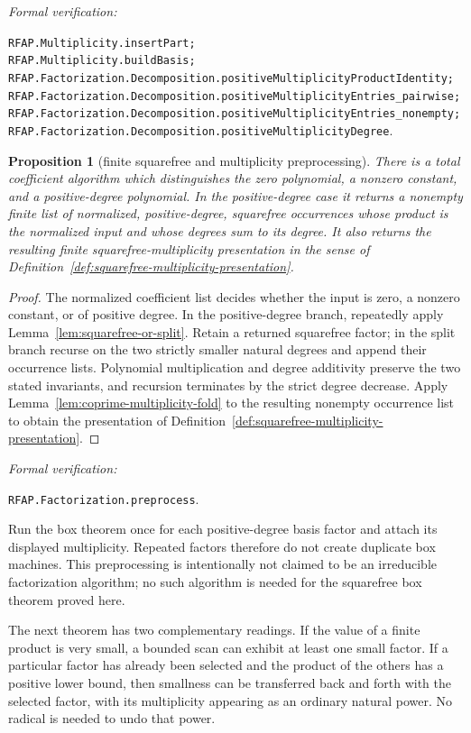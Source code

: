\documentclass[11pt]{article}
\newtheorem{proposition}[theorem]{Proposition}
\newcommand{\Defref}[1]{Definition~\ref{#1}}
\newcommand{\leanref}[1]{\par\smallskip\noindent
  \emph{Formal verification:}\par\nobreak
  {\raggedright\nolinkurl{#1}.\par}}
\begin{document}
\leanref{RFAP.Multiplicity.insertPart;
RFAP.Multiplicity.buildBasis;
RFAP.Factorization.Decomposition.positiveMultiplicityProductIdentity;
RFAP.Factorization.Decomposition.positiveMultiplicityEntries_pairwise;
RFAP.Factorization.Decomposition.positiveMultiplicityEntries_nonempty;
RFAP.Factorization.Decomposition.positiveMultiplicityDegree}

\begin{proposition}[finite squarefree and multiplicity preprocessing]
\label{prop:factor}
There is a total coefficient algorithm which distinguishes the zero
polynomial, a nonzero constant, and a positive-degree polynomial.  In the
positive-degree case it returns a nonempty finite list of normalized,
positive-degree, squarefree occurrences whose product is the
normalized input and whose degrees sum to its degree.  It also returns the
resulting finite squarefree-multiplicity presentation in the sense of
\Defref{def:squarefree-multiplicity-presentation}.
\end{proposition}

\begin{proof}
The normalized coefficient list decides whether the input is zero, a nonzero
constant, or of positive degree.  In the positive-degree branch, repeatedly
apply Lemma~\ref{lem:squarefree-or-split}.  Retain a returned squarefree factor;
in the split branch recurse on the two strictly smaller natural degrees and
append their occurrence lists.  Polynomial multiplication and degree
additivity preserve the two stated invariants, and recursion
terminates by the strict degree decrease.  Apply
Lemma~\ref{lem:coprime-multiplicity-fold} to the resulting nonempty occurrence
list to obtain the presentation of
\Defref{def:squarefree-multiplicity-presentation}.
\end{proof}

\leanref{RFAP.Factorization.preprocess}

Run the box theorem once for each positive-degree basis factor and attach its displayed multiplicity.  Repeated factors therefore do not create duplicate box machines.  This preprocessing is intentionally not claimed to be an irreducible factorization algorithm; no such algorithm is needed for the squarefree box theorem proved here.

The next theorem has two complementary readings.  If the value of a finite
product is very small, a bounded scan can exhibit at least one small factor.
If a particular factor has already been selected and the product of the
others has a positive lower bound, then smallness can be transferred back and
forth with the selected factor, with its multiplicity appearing as an
ordinary natural power.  No radical is needed to undo that power.
\end{document}
